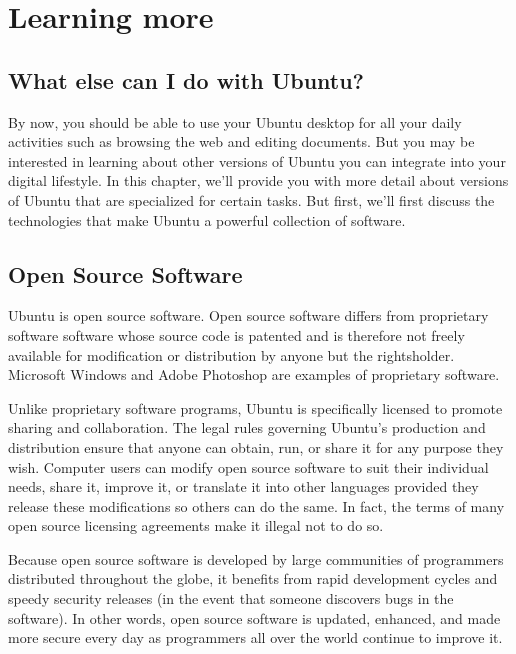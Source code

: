 
\chapter{Learning more}
\label{ch:learning-more}

\section{What else can I do with Ubuntu?}

By now, you should be able to use your Ubuntu desktop for all your daily activities \dash such as browsing the web and editing documents. But you may be interested in learning about other versions of Ubuntu you can integrate into your digital lifestyle. In this chapter, we'll provide you with more detail about versions of Ubuntu that are specialized for certain tasks. But first, we'll first discuss the technologies that make Ubuntu a powerful collection of software.

\section{Open Source Software}

Ubuntu is open source software. Open source software differs from proprietary software \dash software whose source code is patented and is therefore not freely available for modification or distribution by anyone but the rightsholder. Microsoft Windows and Adobe Photoshop are examples of proprietary software. 

Unlike proprietary software programs, Ubuntu is specifically licensed to promote sharing and collaboration. The legal rules governing Ubuntu's production and distribution ensure that anyone can obtain, run, or share it for any purpose they wish. Computer users can modify open source software to suit their individual needs, share it, improve it, or translate it into other languages \dash provided they release these modifications so others can do the same. In fact, the terms of many open source licensing agreements make it illegal not to do so.

Because open source software is developed by large communities of programmers distributed throughout the globe, it benefits from rapid development cycles and speedy security releases (in the event that someone discovers bugs in the software). In other words, open source software is updated, enhanced, and made more secure every day as programmers all over the world continue to improve it.

